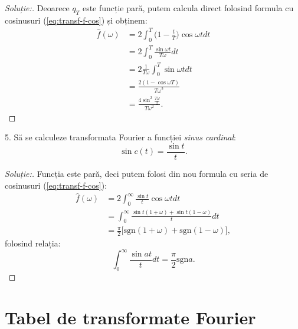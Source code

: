 \documentclass[12pt,a4paper]{article}
\theoremstyle{dotless}
\theoremstyle{dotlessdr}
\newenvironment{solution}
{\begin{proof}[Soluție:\nopunct]}
  {\end{proof}}
\begin{document}
\begin{solution}
  Deoarece $ q_T $ este funcție pară, putem calcula direct folosind formula cu cosinusuri
  (\eqref{eq:transf-f-cos}) și obținem:
  \begin{align*}
    \widehat{f}(\omega) &= 2 \int_0^T \Big( 1 - \frac{t}{T} \Big) \cos \omega t dt \\
                        &= 2 \int_0^T \frac{\sin \omega t}{T \omega} dt \\
                        &= 2 \frac{1}{T \omega} \int_0^T \sin \omega t dt \\
                        &= \frac{2(1 - \cos \omega T)}{T \omega^2} \\
                        &= \frac{4 \sin^2 \frac{T\omega}{2}}{T \omega^2}.
  \end{align*}
\end{solution}

\vspace{1cm}

5. Să se calculeze transformata Fourier a funcției \emph{sinus cardinal}:
\[
  \sin c(t) = \frac{\sin t}{t}.
\]

\begin{solution}
  Funcția este pară, deci putem folosi din nou formula cu seria de cosinusuri
  (\eqref{eq:transf-f-cos}):
  \begin{align*}
    \widehat{f}(\omega) &= 2 \int_0^\infty \frac{\sin t}{t} \cos \omega t dt \\
                        &= \int_0^\infty \frac{\sin t(1 + \omega) + \sin t(1 - \omega)}{t} dt \\
                        &= \frac{\pi}{2} \big[ \mathrm{sgn}(1 + \omega) + \mathrm{sgn}(1 - \omega) \big],
  \end{align*}
  folosind relația:
  \[
    \int_0^\infty \frac{\sin at}{t} dt = \frac{\pi}{2} \mathrm{sgn} a.
  \]
\end{solution}


\section*{Tabel de transformate Fourier}
\end{document}
